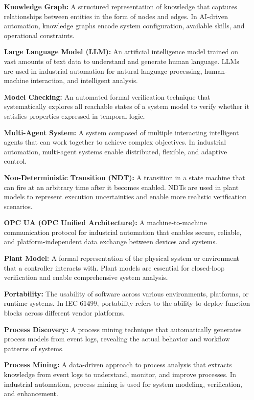 \textbf{Knowledge Graph:} A structured representation of knowledge that captures relationships between entities in the form of nodes and edges. In AI-driven automation, knowledge graphs encode system configuration, available skills, and operational constraints.

\textbf{Large Language Model (LLM):} An artificial intelligence model trained on vast amounts of text data to understand and generate human language. LLMs are used in industrial automation for natural language processing, human-machine interaction, and intelligent analysis.

\textbf{Model Checking:} An automated formal verification technique that systematically explores all reachable states of a system model to verify whether it satisfies properties expressed in temporal logic.

\textbf{Multi-Agent System:} A system composed of multiple interacting intelligent agents that can work together to achieve complex objectives. In industrial automation, multi-agent systems enable distributed, flexible, and adaptive control.

\textbf{Non-Deterministic Transition (NDT):} A transition in a state machine that can fire at an arbitrary time after it becomes enabled. NDTs are used in plant models to represent execution uncertainties and enable more realistic verification scenarios.

\textbf{OPC UA (OPC Unified Architecture):} A machine-to-machine communication protocol for industrial automation that enables secure, reliable, and platform-independent data exchange between devices and systems.

\textbf{Plant Model:} A formal representation of the physical system or environment that a controller interacts with. Plant models are essential for closed-loop verification and enable comprehensive system analysis.

\textbf{Portability:} The usability of software across various environments, platforms, or runtime systems. In IEC 61499, portability refers to the ability to deploy function blocks across different vendor platforms.

\textbf{Process Discovery:} A process mining technique that automatically generates process models from event logs, revealing the actual behavior and workflow patterns of systems.

\textbf{Process Mining:} A data-driven approach to process analysis that extracts knowledge from event logs to understand, monitor, and improve processes. In industrial automation, process mining is used for system modeling, verification, and enhancement.


